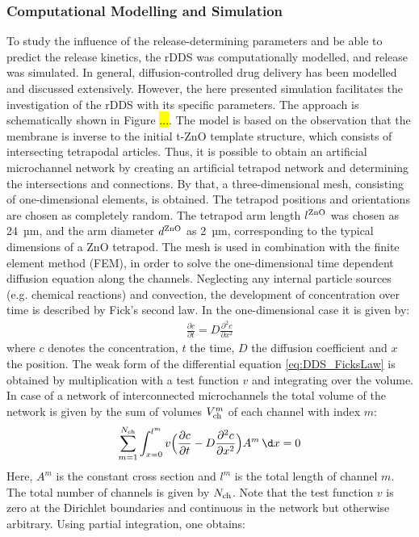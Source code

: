 \subsubsection{Computational Modelling and Simulation}
To study the influence of the release-determining parameters and be able to predict the release kinetics, the rDDS was computationally modelled, and release was simulated. In general, diffusion-controlled drug delivery has been modelled and discussed extensively\supercite{siepmann2012modeling,peppas2014mathematical}. However, the here presented simulation facilitates the investigation of the rDDS with its specific parameters. The approach is schematically shown in Figure \hl{...}. The model is based on the observation that the membrane is inverse to the initial t-ZnO template structure, which consists of intersecting tetrapodal articles. Thus, it is possible to obtain an artificial microchannel network by creating an artificial tetrapod network and determining the intersections and connections. By that, a three-dimensional mesh, consisting of one-dimensional elements, is obtained. The tetrapod positions and orientations are chosen as completely random. The tetrapod arm length $l^{\rm ZnO}$ was chosen as 24~µm, and the arm diameter $d^{\rm ZnO}$ as 2~µm, corresponding to the typical dimensions of a ZnO tetrapod. The mesh is used in combination with the finite element method (FEM), in order to solve the one-dimensional time dependent diffusion equation along the channels. Neglecting any internal particle sources (e.g. chemical reactions) and convection, the development of concentration over time is described by Fick’s second law. In the one-dimensional case it is given by:
\begin{align}
  \frac{\partial c}{\partial t} = D \frac{\partial^2 c}{\partial x^2}
  \label{eq:DDS_FicksLaw}
\end{align}
where $c$ denotes the concentration, $t$ the time, $D$ the diffusion coefficient and $x$ the position. The weak form of the differential equation \ref{eq:DDS_FicksLaw} is obtained by multiplication with a test function $v$ and integrating over the volume. In case of a network of interconnected microchannels the total volume of the network is given by the sum of volumes $V^{m}_{\rm ch}$ of each channel with index $m$:
\begin{align}
  \sum_{m=1}^{N_{\rm ch}} \int_{x=0}^{l^m} v \Big( \frac{\partial c}{\partial t} - D\frac{\partial^2 c}{\partial x^2} \Big) A^m \, \d x = 0
\end{align}
Here, $A^m$ is the constant cross section and $l^m$ is the total length of channel $m$. The total number of channels is given by $N_{\rm ch}$. Note that the test function $v$ is zero at the Dirichlet boundaries and continuous in the network but otherwise arbitrary. Using partial integration, one obtains:
